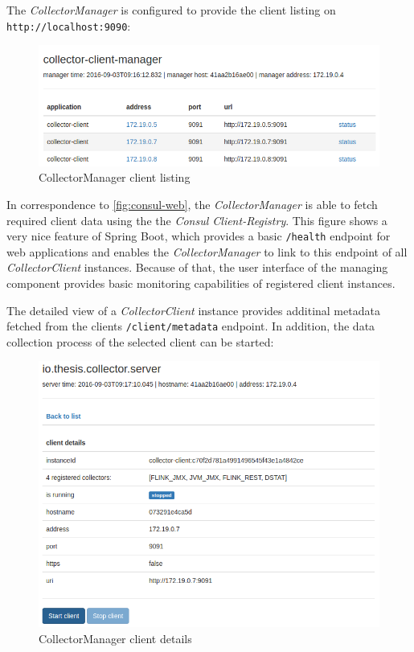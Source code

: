 The \textit{CollectorManager} is configured to provide the client listing on \verb|http://localhost:9090|:
\begin{figure}[H]
	\centering
	\includegraphics[width=1.0\textwidth]{../images/09-cm-start.png}
	\caption{CollectorManager client listing}
	\label{fig:cm-start}
\end{figure}

In correspondence to \autoref{fig:consul-web}, the \textit{CollectorManager} is able to fetch required client data using the the
\textit{Consul Client-Registry}. This figure shows a very nice feature of Spring Boot, which provides a basic \verb|/health| endpoint for web applications and enables the
\textit{CollectorManager} to link to this endpoint of all \textit{CollectorClient} instances. Because of that, the user interface
of the managing component provides basic monitoring capabilities of registered client instances.

The detailed view of a \textit{CollectorClient} instance provides additinal metadata fetched from the clients \verb|/client/metadata| endpoint.
In addition, the data collection process of the selected client can be started:

\begin{figure}[H]
	\centering
	\includegraphics[width=1.0\textwidth]{../images/10-cm-detail.png}
	\caption{CollectorManager client details}
	\label{fig:cm-details}
\end{figure}

